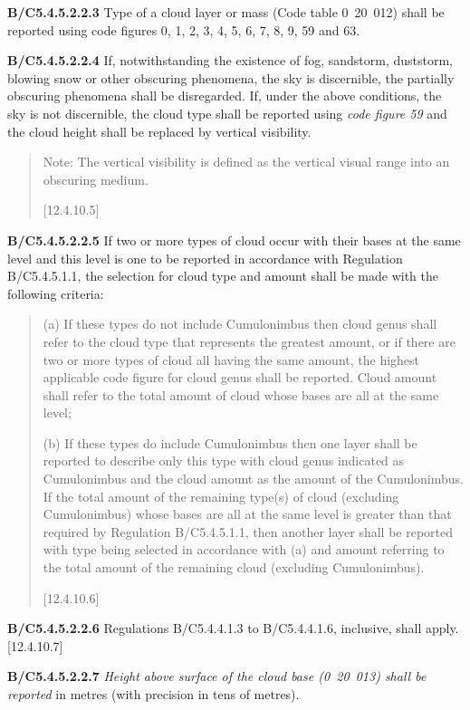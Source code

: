 \textbf{B/C5.4.5.2.2.3} Type of a cloud layer or mass (Code table 0~20~012) shall be reported using code figures 0, 1, 2, 3, 4, 5, 6, 7, 8, 9, 59 and 63.

\textbf{B/C5.4.5.2.2.4} If, notwithstanding the existence of fog, sandstorm, duststorm, blowing snow or other obscuring phenomena, the sky is discernible, the partially obscuring phenomena shall be disregarded. If, under the above conditions, the sky is not discernible, the cloud type shall be reported using \emph{code figure 59} and the cloud height shall be replaced by vertical visibility.

\begin{quote}
Note: The vertical visibility is defined as the vertical visual range into an obscuring medium.

{[}12.4.10.5{]}
\end{quote}

\textbf{B/C5.4.5.2.2.5} If two or more types of cloud occur with their bases at the same level and this level is one to be reported in accordance with Regulation B/C5.4.5.1.1, the selection for cloud type and amount shall be made with the following criteria:

\begin{quote}
(a) If these types do not include Cumulonimbus then cloud genus shall refer to the cloud type that represents the greatest amount, or if there are two or more types of cloud all having the same amount, the highest applicable code figure for cloud genus shall be reported. Cloud amount shall refer to the total amount of cloud whose bases are all at the same level;

(b) If these types do include Cumulonimbus then one layer shall be reported to describe only this type with cloud genus indicated as Cumulonimbus and the cloud amount as the amount of the Cumulonimbus. If the total amount of the remaining type(s) of cloud (excluding Cumulonimbus) whose bases are all at the same level is greater than that required by Regulation B/C5.4.5.1.1, then another layer shall be reported with type being selected in accordance with (a) and amount referring to the total amount of the remaining cloud (excluding Cumulonimbus).

{[}12.4.10.6{]}
\end{quote}

\textbf{B/C5.4.5.2.2.6} Regulations B/C5.4.4.1.3 to B/C5.4.4.1.6, inclusive, shall apply. {[}12.4.10.7{]}

\textbf{B/C5.4.5.2.2.7} \emph{Height above surface of the cloud base (0~20~013) shall be reported} in metres (with precision in tens of metres).

